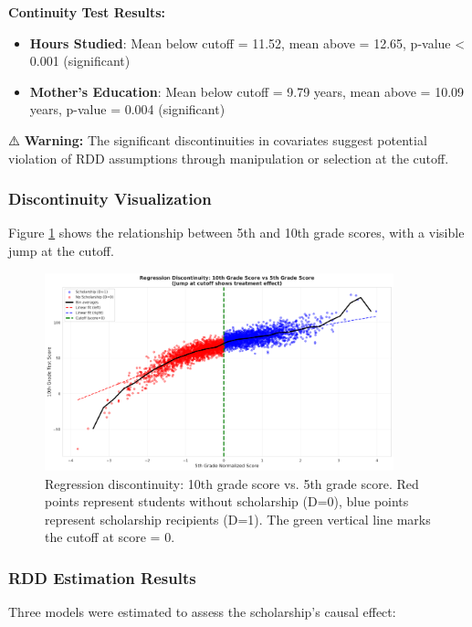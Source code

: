 \documentclass[a4paper,12pt,headsepline]{scrartcl} %
\begin{document}
\textbf{Continuity Test Results:}
\begin{itemize}
    \item \textbf{Hours Studied}: Mean below cutoff = 11.52, mean above = 12.65, p-value < 0.001 (significant)
    \item \textbf{Mother's Education}: Mean below cutoff = 9.79 years, mean above = 10.09 years, p-value = 0.004 (significant)
\end{itemize}

⚠️ \textbf{Warning:} The significant discontinuities in covariates suggest potential violation of RDD assumptions through manipulation or selection at the cutoff.

\subsubsection{Discontinuity Visualization}

Figure \ref{fig:rdd_discontinuity} shows the relationship between 5th and 10th grade scores, with a visible jump at the cutoff.

\begin{figure}[H]
    \centering
    \includegraphics[width=0.9\textwidth]{rdd_discontinuity_plot.png}
    \caption{Regression discontinuity: 10th grade score vs. 5th grade score. Red points represent students without scholarship (D=0), blue points represent scholarship recipients (D=1). The green vertical line marks the cutoff at score = 0.}
    \label{fig:rdd_discontinuity}
\end{figure}

\subsubsection{RDD Estimation Results}

Three models were estimated to assess the scholarship's causal effect:
\end{document}
